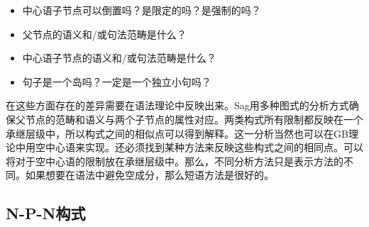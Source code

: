 \begin{exe}
\begin{xlist}[iv.]
\begin{exe}
\begin{xlist}[iv.]
\begin{itemize}
\item 中心语子节点可以倒置吗？是限定的吗？是强制的吗？
\item 父节点的语义和/或句法范畴是什么？
\item 中心语子节点的语义和/或句法范畴是什么？
\item 句子是一个岛吗？一定是一个独立小句吗？
\end{itemize}
在这些方面存在的差异需要在语法理论中反映出来。Sag用多种图式的分析方式确保父节点的范畴和语义与两个子节点的属性对应。两类构式所有限制都反映在一个承继层级中，所以构式之间的相似点可以得到解释。这一分析当然也可以在GB理论中用空中心语来实现。还必须找到某种方法来反映这些构式之间的相同点。可以将对于空中心语的限制放在承继层级中。那么，不同分析方法只是表示方法的不同。如果想要在语法中避免空成分，那么短语方法是很好的。

\subsection{N-P-N构式}
\label{Abschnitt-NPN-Konstruktion}


\end{xlist}
\end{exe}
\end{xlist}
\end{exe}
